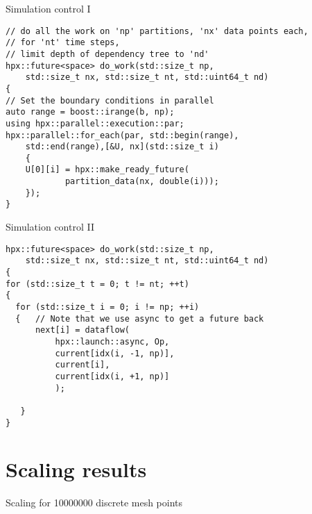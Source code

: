 \documentclass[12pt,t]{beamer}
\begin{document}
\begin{frame}[fragile]{Simulation control I}

\begin{lstlisting}
// do all the work on 'np' partitions, 'nx' data points each, 
// for 'nt' time steps, 
// limit depth of dependency tree to 'nd'
hpx::future<space> do_work(std::size_t np, 
    std::size_t nx, std::size_t nt, std::uint64_t nd)
{
// Set the boundary conditions in parallel
auto range = boost::irange(b, np);
using hpx::parallel::execution::par;
hpx::parallel::for_each(par, std::begin(range), 
    std::end(range),[&U, nx](std::size_t i)
    {
    U[0][i] = hpx::make_ready_future(
    	    partition_data(nx, double(i)));
    });  
}
\end{lstlisting}

\end{frame}

\begin{frame}[fragile]{Simulation control II}

\begin{lstlisting}
hpx::future<space> do_work(std::size_t np, 
    std::size_t nx, std::size_t nt, std::uint64_t nd)
{
for (std::size_t t = 0; t != nt; ++t)
{
  for (std::size_t i = 0; i != np; ++i)
  {   // Note that we use async to get a future back
      next[i] = dataflow(
          hpx::launch::async, Op,
          current[idx(i, -1, np)], 
          current[i], 
          current[idx(i, +1, np)]
          );

   }
}
\end{lstlisting}

\end{frame}


\section{Scaling results}


\begin{frame}{Scaling for 10000000 discrete mesh points}

\begin{center}
\end{center}
\end{frame}
\end{document}
